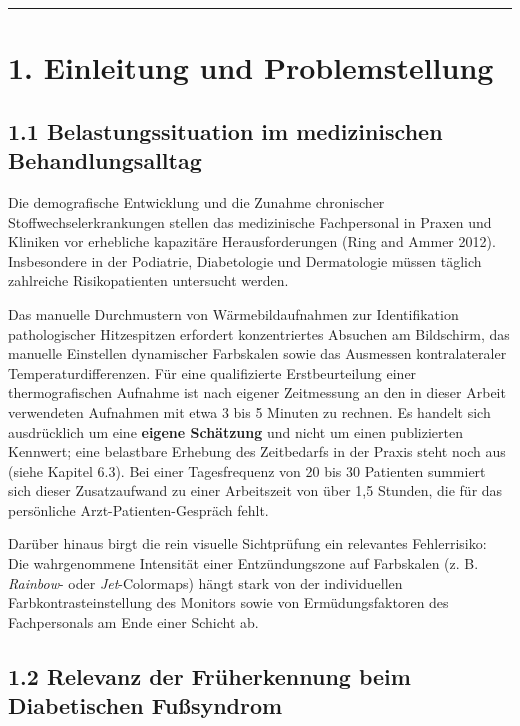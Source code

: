 \documentclass[
  11pt,
]{article}
\begin{document}
\begin{center}\rule{0.5\linewidth}{0.5pt}\end{center}

\section{1. Einleitung und
Problemstellung}\label{einleitung-und-problemstellung}

\subsection{1.1 Belastungssituation im medizinischen
Behandlungsalltag}\label{belastungssituation-im-medizinischen-behandlungsalltag}

Die demografische Entwicklung und die Zunahme chronischer
Stoffwechselerkrankungen stellen das medizinische Fachpersonal in Praxen
und Kliniken vor erhebliche kapazitäre Herausforderungen (Ring and Ammer
2012). Insbesondere in der Podiatrie, Diabetologie und Dermatologie
müssen täglich zahlreiche Risikopatienten untersucht werden.

Das manuelle Durchmustern von Wärmebildaufnahmen zur Identifikation
pathologischer Hitzespitzen erfordert konzentriertes Absuchen am
Bildschirm, das manuelle Einstellen dynamischer Farbskalen sowie das
Ausmessen kontralateraler Temperaturdifferenzen. Für eine qualifizierte
Erstbeurteilung einer thermografischen Aufnahme ist nach eigener
Zeitmessung an den in dieser Arbeit verwendeten Aufnahmen mit etwa 3 bis
5 Minuten zu rechnen. Es handelt sich ausdrücklich um eine
\textbf{eigene Schätzung} und nicht um einen publizierten Kennwert; eine
belastbare Erhebung des Zeitbedarfs in der Praxis steht noch aus (siehe
Kapitel 6.3). Bei einer Tagesfrequenz von 20 bis 30 Patienten summiert
sich dieser Zusatzaufwand zu einer Arbeitszeit von über 1,5 Stunden, die
für das persönliche Arzt-Patienten-Gespräch fehlt.

Darüber hinaus birgt die rein visuelle Sichtprüfung ein relevantes
Fehlerrisiko: Die wahrgenommene Intensität einer Entzündungszone auf
Farbskalen (z. B. \emph{Rainbow}- oder \emph{Jet}-Colormaps) hängt stark
von der individuellen Farbkontrasteinstellung des Monitors sowie von
Ermüdungsfaktoren des Fachpersonals am Ende einer Schicht ab.

\subsection{1.2 Relevanz der Früherkennung beim Diabetischen
Fußsyndrom}\label{relevanz-der-fruxfcherkennung-beim-diabetischen-fuuxdfsyndrom}
\end{document}
